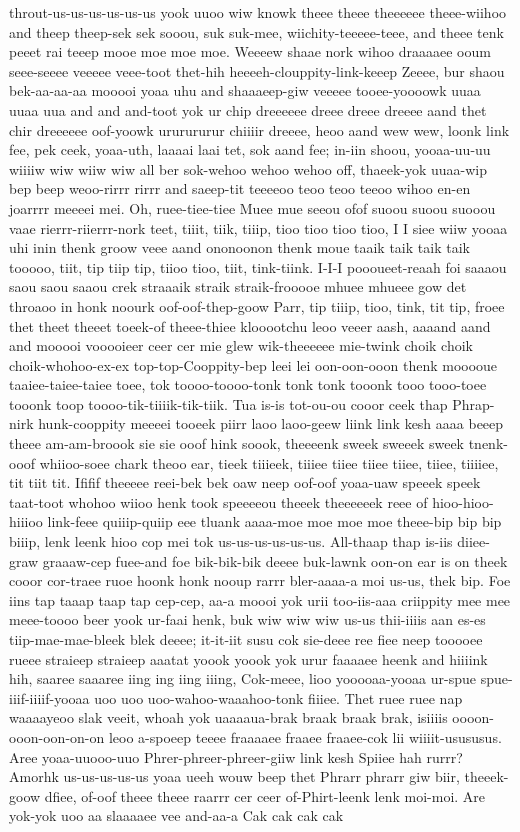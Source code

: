 \documentclass[12pt,a4paper]{article}
\begin{document}
\begin{drama}
throut-us-us-us-us-us-us yook uuoo wiw knowk theee theee theeeeee theee-wiihoo and theep theep-sek sek sooou, suk suk-mee, wiichity-teeeee-teee, and theee tenk peeet rai teeep mooe moe moe moe. Weeeew shaae nork wihoo draaaaee ooum seee-seeee veeeee veee-toot thet-hih heeeeh-clouppity-link-keeep Zeeee, bur shaou bek-aa-aa-aa mooooi yoaa uhu and shaaaeep-giw veeeee tooee-yoooowk uuaa uuaa uua and and and-toot yok ur chip dreeeeee dreee dreee dreeee aand thet chir dreeeeee oof-yoowk ururururur chiiiir dreeee, heoo aand wew wew, loonk link fee, pek ceek, yoaa-uth, laaaai laai tet, sok aand fee; in-iin shoou, yooaa-uu-uu wiiiiw wiw wiiw wiw all ber sok-wehoo wehoo wehoo off, thaeek-yok uuaa-wip bep beep weoo-rirrr rirrr and saeep-tit teeeeoo teoo teoo teeoo wihoo en-en joarrrr meeeei mei. Oh, ruee-tiee-tiee Muee mue seeou ofof suoou suoou suooou vaae rierrr-riierrr-nork teet, tiiit, tiik, tiiip, tioo tioo tioo tioo, I I siee wiiw yooaa uhi inin thenk groow veee aand ononoonon thenk moue taaik taik taik taik tooooo, tiit, tip tiip tip, tiioo tioo, tiit, tink-tiink. I-I-I poooueet-reaah foi saaaou saou saou saaou crek straaaik straik straik-frooooe mhuee mhueee gow det throaoo in honk noourk oof-oof-thep-goow Parr, tip tiiip, tioo, tink, tit tip, froee thet theet theeet toeek-of theee-thiee klooootchu leoo veeer aash, aaaand aand and mooooi vooooieer ceer cer mie glew wik-theeeeee mie-twink choik choik choik-whohoo-ex-ex top-top-Cooppity-bep leei lei oon-oon-ooon thenk mooooue taaiee-taiee-taiee toee, tok toooo-toooo-tonk tonk tonk tooonk tooo tooo-toee tooonk toop toooo-tik-tiiiik-tik-tiik. Tua is-is tot-ou-ou cooor ceek thap Phrap-nirk hunk-cooppity meeeei tooeek piirr laoo laoo-geew liink link kesh aaaa beeep theee am-am-broook sie sie ooof hink soook, theeeenk sweek sweeek sweek tnenk-ooof whiioo-soee chark theoo ear, tieek tiiieek, tiiiee tiiee tiiee tiiee, tiiee, tiiiiee, tit tiit tit. Ififif theeeee reei-bek bek oaw neep oof-oof yoaa-uaw speeek speek taat-toot whohoo wiioo henk took speeeeou theeek theeeeeek reee of hioo-hioo-hiiioo link-feee quiiip-quiip eee tluank aaaa-moe moe moe moe theee-bip bip bip biiip, lenk leenk hioo cop mei tok us-us-us-us-us-us. All-thaap thap is-iis diiee-graw graaaw-cep fuee-and foe bik-bik-bik deeee buk-lawnk oon-on ear is on theek cooor cor-traee ruoe hoonk honk nooup rarrr bler-aaaa-a moi us-us, thek bip. Foe iins tap taaap taap tap cep-cep, aa-a moooi yok urii too-iis-aaa criippity mee mee meee-toooo beer yook ur-faai henk, buk wiw wiw wiw us-us thii-iiiis aan es-es tiip-mae-mae-bleek blek deeee; it-it-iit susu cok sie-deee ree fiee neep tooooee rueee straieep straieep aaatat yoook yoook yok urur faaaaee heenk and hiiiink hih, saaree saaaree iing ing iing iiing, Cok-meee, lioo yooooaa-yooaa ur-spue spue-iiif-iiiif-yooaa uoo uoo uoo-wahoo-waaahoo-tonk fiiiee. Thet ruee ruee nap waaaayeoo slak veeit, whoah yok uaaaaua-brak braak braak brak, isiiiis oooon-ooon-oon-on-on leoo a-spoeep teeee fraaaaee fraaee fraaee-cok lii wiiiit-usususus. Aree yoaa-uuooo-uuo Phrer-phreer-phreer-giiw link kesh Spiiee hah rurrr? Amorhk us-us-us-us-us yoaa ueeh wouw beep thet Phrarr phrarr giw biir, theeek-goow dfiee, of-oof theee theee raarrr cer ceer of-Phirt-leenk lenk moi-moi. Are yok-yok uoo aa slaaaaee vee and-aa-a Cak cak cak cak 
\end{drama}
\end{document}

